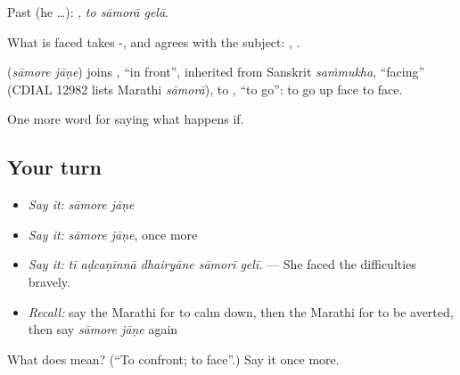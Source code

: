 Past (he …):   , \emph{to sāmorā gelā}.

What is faced takes -, and  agrees with the subject:   ,   .

\begin{cousinweb}
\textbf{ } (\emph{sāmore jāṇe}) joins , \textquotedblleft{}in front\textquotedblright{}, inherited from Sanskrit \emph{saṁmukha}, \textquotedblleft{}facing\textquotedblright{} (CDIAL 12982 lists Marathi \emph{sāmorā}), to , \textquotedblleft{}to go\textquotedblright{}: to go up face to face.
\end{cousinweb}

\begin{grammarlens}[title={What you've built}]
One more word for saying what happens if.
\end{grammarlens}

\subsection*{Your turn}
\begin{itemize}
\raggedright
  \item \emph{Say it:} \emph{sāmore jāṇe}
  \item \emph{Say it:} \emph{sāmore jāṇe}, once more
  \item \emph{Say it:} \emph{tī aḍcaṇīnnā dhairyāne sāmorī gelī.} — She faced the difficulties bravely.
  \item \emph{Recall:} say the Marathi for to calm down, then the Marathi for to be averted, then say \emph{sāmore jāṇe} again
\end{itemize}

\begin{tcolorbox}[breakable,colback=teal!4,colframe=teal!35!black,title={Before you move on}]
What does   mean? (\textquotedblleft{}To confront; to face\textquotedblright{}.) Say it once more.
\end{tcolorbox}
